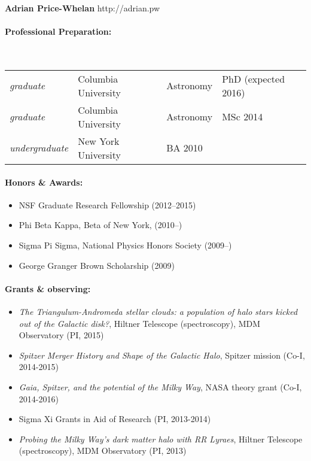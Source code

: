 \documentclass[12pt]{article}
\begin{document}
\noindent
\textbf{Adrian Price-Whelan} \hfill http://adrian.pw
\smallskip

\paragraph{Professional Preparation:}~\\[3pt]
\begin{tabular}{llll}
\textsl{graduate} & Columbia University & Astronomy & PhD (expected 2016) \\
\textsl{graduate} & Columbia University & Astronomy & MSc 2014 \\
\textsl{undergraduate} & New York University & BA 2010 \\
\end{tabular}

\paragraph{Honors \& Awards:}
\begin{itemize}
	\item NSF Graduate Research Fellowship (2012--2015)
	\item Phi Beta Kappa, Beta of New York, (2010--)
	\item Sigma Pi Sigma, National Physics Honors Society (2009--)
	\item George Granger Brown Scholarship (2009)
\end{itemize}

\paragraph{Grants \& observing:}
\begin{itemize}
	\item {\it The Triangulum-Andromeda stellar clouds: a population of halo stars kicked out of the Galactic disk?}, Hiltner Telescope (spectroscopy), MDM Observatory (PI, 2015)
	\item {\it Spitzer Merger History and Shape of the Galactic Halo}, Spitzer mission (Co-I, 2014-2015)
	\item {\it Gaia, Spitzer, and the potential of the Milky Way}, NASA theory grant (Co-I, 2014-2016)
	\item Sigma Xi Grants in Aid of Research (PI, 2013-2014)
	\item {\it Probing the Milky Way's dark matter halo with RR Lyraes}, Hiltner Telescope (spectroscopy), MDM Observatory (PI, 2013)
\end{itemize}
\end{document}
